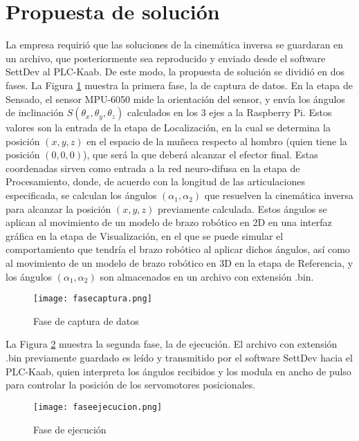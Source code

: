\section{Propuesta de solución}

La empresa requirió que las soluciones de la cinemática inversa se guardaran en un archivo, que posteriormente sea reproducido y enviado desde el software SettDev al PLC-Kaab. De este modo, la propuesta de solución se dividió en dos fases. La Figura \ref{fig:fasecaptura} muestra la primera fase, la de captura de datos. En la etapa de Sensado, el sensor MPU-6050 mide la orientación del sensor, y envía los ángulos de inclinación $S(\theta_x, \theta_y, \theta_z)$ calculados en los 3 ejes a la Raspberry Pi. Estos valores son la entrada de la etapa de Localización, en la cual se determina la posición $(x, y, z)$ en el espacio de la muñeca respecto al hombro (quien tiene la posición $(0, 0, 0)$), que será la que deberá alcanzar el efector final. Estas coordenadas sirven como entrada a la red neuro-difusa en la etapa de Procesamiento, donde, de acuerdo con la longitud de las articulaciones especificada, se calculan los ángulos $(\alpha_1, \alpha_2)$ que resuelven la cinemática inversa para alcanzar la posición $(x, y, z)$ previamente calculada. Estos ángulos se aplican al movimiento de un modelo de brazo robótico en 2D en una interfaz gráfica en la etapa de Visualización, en el que se puede simular el comportamiento que tendría el brazo robótico al aplicar dichos ángulos, así como al movimiento de un modelo de brazo robótico en 3D en la etapa de Referencia, y los ángulos $(\alpha_1, \alpha_2)$ son almacenados en un archivo con extensión .bin.

\begin{figure}[htb]
	\centering
	\texttt{[image: fasecaptura.png]}
	\caption{Fase de captura de datos}
	\label{fig:fasecaptura}
\end{figure}

\newpage
La Figura \ref{fig:faseejecucion} muestra la segunda fase, la de ejecución. El archivo con extensión .bin previamente guardado es leído y transmitido por el software SettDev hacia el PLC-Kaab, quien interpreta los ángulos recibidos y los modula en ancho de pulso para controlar la posición de los servomotores posicionales.

\begin{figure}[htb]
	\centering
	\texttt{[image: faseejecucion.png]}
	\caption{Fase de ejecución}
	\label{fig:faseejecucion}
\end{figure}